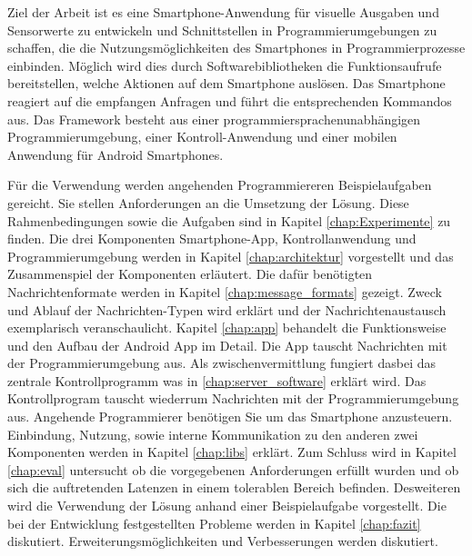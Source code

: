 \documentclass[11pt,a4paper]{report}
\begin{document}
Ziel der Arbeit ist es eine Smartphone-Anwendung für visuelle Ausgaben und Sensorwerte zu entwickeln und Schnittstellen in Programmierumgebungen zu schaffen, die die Nutzungsmöglichkeiten des Smartphones in Programmierprozesse einbinden.
Möglich wird dies durch Softwarebibliotheken die Funktionsaufrufe bereitstellen, welche Aktionen auf dem Smartphone auslösen.
Das Smartphone reagiert auf die empfangen Anfragen und führt die entsprechenden Kommandos aus.
Das Framework besteht aus einer programmiersprachenunabhängigen Programmierumgebung, einer Kontroll-Anwendung und einer mobilen Anwendung für Android Smartphones.

Für die Verwendung werden angehenden Programmiereren Beispielaufgaben gereicht.
Sie stellen Anforderungen an die Umsetzung der Lösung.
Diese Rahmenbedingungen sowie die Aufgaben sind in Kapitel \ref{chap:Experimente} zu finden.
Die drei Komponenten Smartphone-App, Kontrollanwendung und Programmierumgebung werden
in Kapitel \ref{chap:architektur} vorgestellt und das Zusammenspiel der Komponenten erläutert.
Die dafür benötigten Nachrichtenformate werden in Kapitel \ref{chap:message_formats} gezeigt.
Zweck und Ablauf der Nachrichten-Typen wird erklärt und der Nachrichtenaustausch exemplarisch veranschaulicht.
Kapitel \ref{chap:app} behandelt die Funktionsweise und den Aufbau der Android App im Detail.
Die App tauscht Nachrichten mit der Programmierumgebung aus.
Als zwischenvermittlung fungiert dasbei das zentrale Kontrollprogramm was in \ref{chap:server_software} erklärt wird.
Das Kontrollprogram tauscht wiederrum Nachrichten mit der Programmierumgebung aus.
Angehende Programmierer benötigen Sie um das Smartphone anzusteuern.
Einbindung, Nutzung, sowie interne Kommunikation zu den anderen zwei Komponenten werden in Kapitel \ref{chap:libs} erklärt.
Zum Schluss wird in Kapitel \ref{chap:eval} untersucht ob die vorgegebenen Anforderungen erfüllt wurden und ob sich die auftretenden Latenzen in einem tolerablen Bereich befinden.
Desweiteren wird die Verwendung der Lösung anhand einer Beispielaufgabe vorgestellt.
Die bei der Entwicklung festgestellten Probleme werden in Kapitel \ref{chap:fazit} diskutiert.
Erweiterungsmöglichkeiten und Verbesserungen werden diskutiert.
\end{document}
